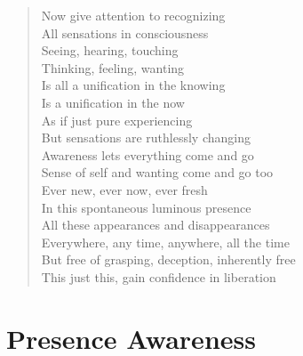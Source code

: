\documentclass[12pt,openany]{book}
\begin{document}
\begin{verse}
Now give attention to recognizing \\ 
All sensations in consciousness \\ 
Seeing, hearing, touching \\ 
Thinking, feeling, wanting \\ 
Is all a unification in the knowing \\ 
Is a unification in the now \\ 
As if just pure experiencing \\ 
But sensations are ruthlessly changing \\ 
Awareness lets everything come and go \\ 
Sense of self and wanting come and go too \\ 
Ever new, ever now, ever fresh \\ 
In this spontaneous luminous presence \\ 
All these appearances and disappearances \\ 
Everywhere, any time, anywhere, all the time \\ 
But free of grasping, deception, inherently free \\ 
This just this, gain confidence in liberation
\end{verse}

\begin{figure}[h]
    \centering
\end{figure}

\chapter*{Presence Awareness}
\end{document}
